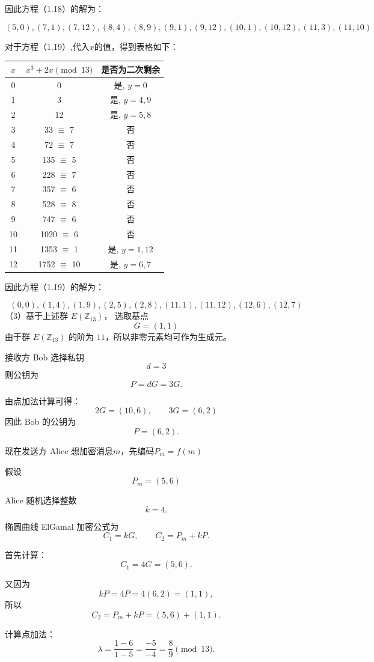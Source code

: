 \documentclass[12pt,a4paper]{article}
\begin{document}
因此方程（1.18）的解为：

\[
(5,0),(7,1),(7,12),(8,4),(8,9),(9,1),(9,12),(10,1),(10,12),(11,3),(11,10)
\]

对于方程（1.19）,代入$x$的值，得到表格如下：

\begin{center}
\begin{tabular}{c|c|c}
$x$ & $x^3 + 2x \pmod{13}$ & 是否为二次剩余 \\
\hline
0 & 0 & 是, $y = 0$ \\
1 & 3 & 是, $y = 4, 9$ \\
2 & 12 & 是, $y = 5, 8$ \\
3 & 33 $\equiv$ 7 & 否 \\
4 & 72 $\equiv$ 7 & 否 \\
5 & 135 $\equiv$ 5 & 否 \\
6 & 228 $\equiv$ 7 & 否 \\
7 & 357 $\equiv$ 6 & 否 \\
8 & 528 $\equiv$ 8 & 否 \\
9 & 747 $\equiv$ 6 & 否 \\
10 & 1020 $\equiv$ 6 & 否 \\
11 & 1353 $\equiv$ 1 & 是, $y = 1, 12$ \\
12 & 1752 $\equiv$ 10 & 是, $y = 6, 7$ \\
\end{tabular}
\end{center}

因此方程（1.19）的解为：

\[
(0,0),(1,4),(1,9),(2,5),(2,8),(11,1),(11,12),(12,6),(12,7)
\]
（3）基于上述群 $E(\mathbb{Z}_{13})$，
选取基点
\[
G=(1,1)
\]
由于群 $E(\mathbb{Z}_{13})$ 的阶为 $11$，所以非零元素均可作为生成元。

接收方 Bob 选择私钥
\[
d=3
\]
则公钥为
\[
P=dG=3G.
\]

由点加法计算可得：
\[
2G=(10,6),\qquad 3G=(6,2)
\]
因此 Bob 的公钥为
\[
P=(6,2).
\]

现在发送方 Alice 想加密消息\(m\)，先编码\(P_m=f(m)\)

假设
\[
P_m=(5,6)
\]

Alice 随机选择整数
\[
k=4.
\]

椭圆曲线 ElGamal 加密公式为
\[
C_1=kG,\qquad C_2=P_m+kP.
\]

首先计算：
\[
C_1=4G=(5,6).
\]

又因为
\[
kP=4P=4(6,2)=(1,1),
\]
所以
\[
C_2=P_m+kP=(5,6)+(1,1).
\]

计算点加法：
\[
\lambda=\frac{1-6}{1-5}
=\frac{-5}{-4}
=\frac{8}{9}\pmod{13}.
\]
\end{document}

